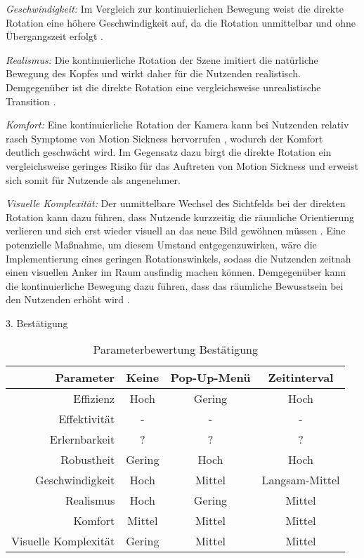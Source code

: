 \textit{Geschwindigkeit:}
Im Vergleich zur kontinuierlichen Bewegung weist die direkte Rotation eine höhere Geschwindigkeit auf, da die Rotation unmittelbar und ohne Übergangszeit erfolgt \citep{8797722}. 

\textit{Realismus:}
Die kontinuierliche Rotation der Szene imitiert die natürliche Bewegung des Kopfes und wirkt daher für die Nutzenden realistisch. Demgegenüber ist die direkte Rotation eine vergleichsweise unrealistische Transition \citep{8797722}. 

\textit{Komfort:}
Eine kontinuierliche Rotation der Kamera kann bei Nutzenden relativ rasch Symptome von Motion Sickness hervorrufen \citep{10.1007/s10055-020-00425-x, 8797722}, wodurch der Komfort deutlich geschwächt wird. Im Gegensatz dazu birgt die direkte Rotation ein vergleichsweise geringes Risiko für das Auftreten von Motion Sickness \citep{10.1007/s10055-020-00425-x, 8797722} und erweist sich somit für Nutzende als angenehmer.

\textit{Visuelle Komplexität:}
Der unmittelbare Wechsel des Sichtfelds bei der direkten Rotation kann dazu führen, dass Nutzende kurzzeitig die räumliche Orientierung verlieren und sich erst wieder visuell an das neue Bild gewöhnen müssen \citep{10.1145/3441852.3471230}. Eine potenzielle Maßnahme, um diesem Umstand entgegenzuwirken, wäre die Implementierung eines geringen Rotationswinkels, sodass die Nutzenden zeitnah einen visuellen Anker im Raum ausfindig machen können. Demgegenüber kann die kontinuierliche Bewegung dazu führen, dass das räumliche Bewusstsein bei den Nutzenden erhöht wird \citep{10.1145/3441852.3471230}.

3. Bestätigung

\begin{table}[ht]
 \centering
 \begin{tabular}{r|c|c|c} 
 Parameter & Keine & Pop-Up-Menü & Zeitinterval \\
 \hline
 Effizienz & Hoch & Gering & Hoch \\
 Effektivität & - & - & -\\
 Erlernbarkeit & ? & ? & ? \\
 Robustheit & Gering & Hoch & Hoch\\
 Geschwindigkeit & Hoch & Mittel & Langsam-Mittel\\
 Realismus & Hoch & Gering & Mittel \\
 Komfort & Mittel & Mittel & Mittel \\
 Visuelle Komplexität & Gering & Mittel & Mittel
 \end{tabular}
 \caption{Parameterbewertung Bestätigung}
 \label{tab:Bestätigung}
\end{table}

